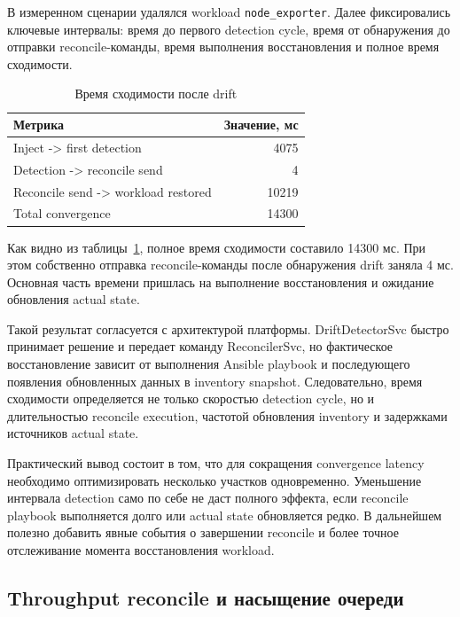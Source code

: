 В измеренном сценарии удалялся workload \texttt{node\_exporter}. Далее фиксировались ключевые интервалы: время до первого detection cycle, время от обнаружения до отправки reconcile-команды, время выполнения восстановления и полное время сходимости.

\begin{table}
    \centering
    \caption{Время сходимости после drift}
    \label{tab:ch4-convergence-time}
    \footnotesize
    \begin{tabularx}{0.8\textwidth}{|X|r|}\hline
    Метрика & Значение, мс \\ \hline
    Inject -> first detection & 4075 \\ \hline
    Detection -> reconcile send & 4 \\ \hline
    Reconcile send -> workload restored & 10219 \\ \hline
    Total convergence & 14300 \\ \hline
    \end{tabularx}
    \normalsize
\end{table}

Как видно из таблицы~\ref{tab:ch4-convergence-time}, полное время сходимости составило 14300 мс. При этом собственно отправка reconcile-команды после обнаружения drift заняла 4 мс. Основная часть времени пришлась на выполнение восстановления и ожидание обновления actual state.

Такой результат согласуется с архитектурой платформы. DriftDetectorSvc быстро принимает решение и передает команду ReconcilerSvc, но фактическое восстановление зависит от выполнения Ansible playbook и последующего появления обновленных данных в inventory snapshot. Следовательно, время сходимости определяется не только скоростью detection cycle, но и длительностью reconcile execution, частотой обновления inventory и задержками источников actual state.

Практический вывод состоит в том, что для сокращения convergence latency необходимо оптимизировать несколько участков одновременно. Уменьшение интервала detection само по себе не даст полного эффекта, если reconcile playbook выполняется долго или actual state обновляется редко. В дальнейшем полезно добавить явные события о завершении reconcile и более точное отслеживание момента восстановления workload.

\subsection{Throughput reconcile и насыщение очереди}

